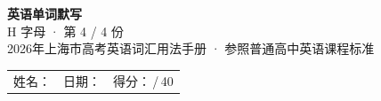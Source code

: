 \documentclass[10pt,a4paper]{article}
\begin{document}
\pagestyle{plain}

\begin{center}
{\LARGE\bfseries 英语单词默写}\\[0.22em]
{\large H 字母 · 第 4 / 4 份}\\[0.18em]
{\small 2026年上海市高考英语词汇用法手册 · 参照普通高中英语课程标准}
\end{center}

\vspace{0.25em}
\noindent\begin{tabular}{@{}p{}@{}p{}@{}p{}@{}}
姓名：\underline{\hspace{2.0cm}} & 日期：\underline{\hspace{2.0cm}} & 得分：\underline{\hspace{1.3cm}}\,/\,40 \\
\end{tabular}

\vspace{0.3em}

\vspace{0.08em}
\end{document}
